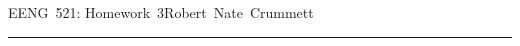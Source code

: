 


\def\qed{\vrule height 6pt width 6pt depth 0pt}
\parindent 0pt
\parskip 2mm


EENG~521: Homework~3\hfill Robert~Nate~Crummett
\smallskip
\hrule





\bye
